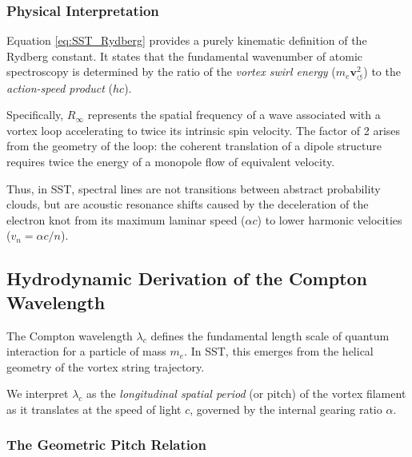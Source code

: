 \documentclass[10pt,reprint,aps,onecolumn,nofootinbib]{revtex4-2}
\begin{document}
    \subsubsection*{Physical Interpretation}

        Equation \eqref{eq:SST_Rydberg} provides a purely kinematic definition
        of the Rydberg constant. It states that the fundamental wavenumber of
        atomic spectroscopy is determined by the ratio of the \emph{vortex
swirl energy} ($m_e \mathbf{v}_{\!\boldsymbol{\circlearrowleft}}^2$) to the \emph{action-speed product} ($hc$).

        Specifically, $R_\infty$ represents the spatial frequency of a wave
        associated with a vortex loop accelerating to twice its intrinsic spin
        velocity. The factor of 2 arises from the geometry of the loop: the
        coherent translation of a dipole structure requires twice the energy
        of a monopole flow of equivalent velocity.

        Thus, in SST, spectral lines are not transitions between abstract
        probability clouds, but are acoustic resonance shifts caused by the
        deceleration of the electron knot from its maximum laminar speed
        ($\alpha c$) to lower harmonic velocities ($v_n = \alpha c / n$).
\subsection{Hydrodynamic Derivation of the Compton Wavelength}
    \label{sec:SST_compton}

    The Compton wavelength $\lambda_c$ defines the fundamental length scale of
    quantum interaction for a particle of mass $m_e$. In SST, this emerges
    from the helical geometry of the vortex string trajectory.

    We interpret $\lambda_c$ as the \emph{longitudinal spatial period} (or pitch)
    of the vortex filament as it translates at the speed of light $c$,
    governed by the internal gearing ratio $\alpha$.

    \subsubsection*{The Geometric Pitch Relation}
\end{document}
